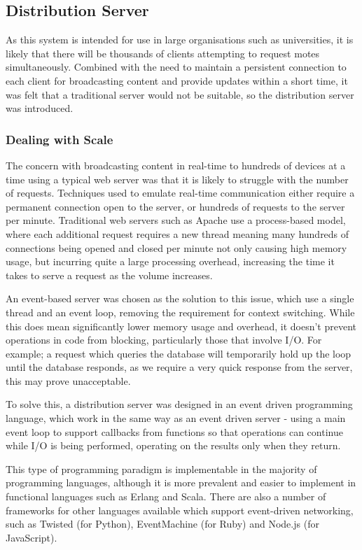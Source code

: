 \documentclass[a4papert,11pt,notitlepage]{article}
\begin{document}
\subsection{Distribution Server}
As this system is intended for use in large organisations such as universities, it is likely that there will be thousands of clients attempting to request motes simultaneously. Combined with the need to maintain a persistent connection to each client for broadcasting content and provide updates within a short time, it was felt that a traditional server would not be suitable, so the distribution server was introduced.

\subsubsection{Dealing with Scale}
The concern with broadcasting content in real-time to hundreds of devices at a time using a typical web server was that it is likely to struggle with the number of requests. Techniques used to emulate real-time communication either require a permanent connection open to the server, or hundreds of requests to the server per minute. Traditional web servers such as Apache\cite{apache:web} use a process-based model, where each additional request requires a new thread meaning many hundreds of connections being opened and closed per minute not only causing high memory usage, but incurring quite a large processing overhead, increasing the time it takes to serve a request as the volume increases.

An event-based server was chosen as the solution to this issue, which use a single thread and an event loop, removing the requirement for context switching. While this does mean significantly lower memory usage and overhead, it doesn't prevent operations in code from blocking\cite{asyncio:web}, particularly those that involve I/O. For example; a request which queries the database will temporarily hold up the loop until the database responds, as we require a very quick response from the server, this may prove unacceptable.

To solve this, a distribution server was designed in an event driven programming language, which work in the same way as an event driven server - using a main event loop to support callbacks from functions so that operations can continue while I/O is being performed, operating on the results only when they return.

This type of programming paradigm is implementable in the majority of programming languages, although it is more prevalent and easier to implement in functional languages such as Erlang and Scala. There are also a number of frameworks for other languages available which support event-driven networking, such as Twisted\cite{twisted:web} (for Python), EventMachine\cite{eventmachine:web} (for Ruby) and Node.js (for JavaScript). 
\end{document}
